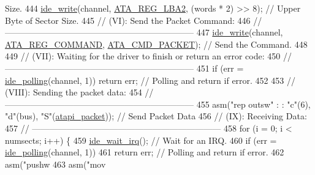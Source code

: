 \begin{DoxyCode}
{       Size.}
444    \hyperlink{a00023_afdb22c37a32d86fcb64e55b3edab4790_afdb22c37a32d86fcb64e55b3edab4790}{ide\_write}(channel, \hyperlink{a00023_afaf134917cbfc81c86b4e1d67930757a_afaf134917cbfc81c86b4e1d67930757a}{ATA\_REG\_LBA2}, (words * 2) >> 8);   \textcolor{comment}{// Upper Byte of Sector Size.}
445    \textcolor{comment}{// (VI): Send the Packet Command:}
446    \textcolor{comment}{// ------------------------------------------------------------------}
447    \hyperlink{a00023_afdb22c37a32d86fcb64e55b3edab4790_afdb22c37a32d86fcb64e55b3edab4790}{ide\_write}(channel, \hyperlink{a00023_a1a54069e05845badff84e1490ca4681e_a1a54069e05845badff84e1490ca4681e}{ATA\_REG\_COMMAND}, \hyperlink{a00023_afaaead63f9b69425b9f6514b03f0bbb2_afaaead63f9b69425b9f6514b03f0bbb2}{ATA\_CMD\_PACKET});      \textcolor{comment}{// Send
       the Command.}
448  
449    \textcolor{comment}{// (VII): Waiting for the driver to finish or return an error code:}
450    \textcolor{comment}{// ------------------------------------------------------------------}
451    \textcolor{keywordflow}{if} (err = \hyperlink{a00023_a03e85b94d6fbfb957e1b88c3dd064eca_a03e85b94d6fbfb957e1b88c3dd064eca}{ide\_polling}(channel, 1)) \textcolor{keywordflow}{return} err;         \textcolor{comment}{// Polling and return if error.}
452  
453    \textcolor{comment}{// (VIII): Sending the packet data:}
454    \textcolor{comment}{// ------------------------------------------------------------------}
455    \textcolor{keyword}{asm}(\textcolor{stringliteral}{"rep   outsw"} : : \textcolor{stringliteral}{"c"}(6), \textcolor{stringliteral}{"d"}(bus), \textcolor{stringliteral}{"S"}(\hyperlink{a00023_a02351861ecf3191d5dbbcc1910b7c109_a02351861ecf3191d5dbbcc1910b7c109}{atapi\_packet}));   \textcolor{comment}{// Send Packet Data}
456    \textcolor{comment}{// (IX): Receiving Data:}
457    \textcolor{comment}{// ------------------------------------------------------------------}
458    \textcolor{keywordflow}{for} (i = 0; i < numsects; i++) \{
459       \hyperlink{a00023_a31655fcec0cc8f9f8792b98cd4441fdf_a31655fcec0cc8f9f8792b98cd4441fdf}{ide\_wait\_irq}();                  \textcolor{comment}{// Wait for an IRQ.}
460       \textcolor{keywordflow}{if} (err = \hyperlink{a00023_a03e85b94d6fbfb957e1b88c3dd064eca_a03e85b94d6fbfb957e1b88c3dd064eca}{ide\_polling}(channel, 1))
461          \textcolor{keywordflow}{return} err;      \textcolor{comment}{// Polling and return if error.}
462       \textcolor{keyword}{asm}(\textcolor{stringliteral}{"pushw %
463       \textcolor{keyword}{asm}(\textcolor{stringliteral}{"mov %
}}
\end{DoxyCode}
